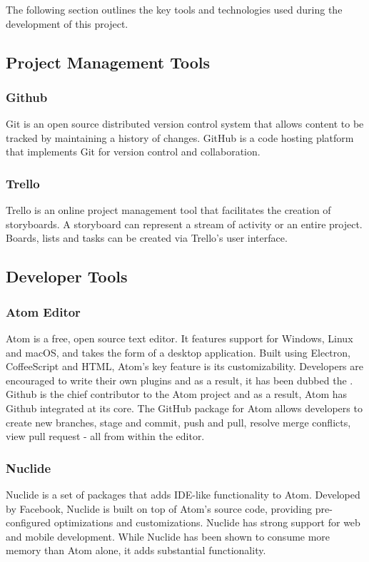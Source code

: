 The following section outlines the key tools and technologies used during the development of this project.


\subsection{Project Management Tools}

\subsubsection{Github}
Git is an open source distributed version control system that allows content to be tracked by maintaining a history of changes. GitHub is a code hosting platform that implements Git for version control and collaboration.
\subsubsection{Trello}
Trello is an online project management tool that facilitates the creation of storyboards. A storyboard can represent a stream of activity or an entire project. Boards, lists and tasks can be created via Trello's user interface. 


\subsection{Developer Tools}

\subsubsection{Atom Editor}
Atom is a free, open source text editor. It features support for Windows, Linux and macOS, and takes the form of a desktop application. Built using Electron, CoffeeScript and HTML, Atom’s key feature is its customizability. Developers are encouraged to write their own plugins and as a result, it has been dubbed the \cite{atom}.
Github is the chief contributor to the Atom project and as a result, Atom has Github integrated at its core. The GitHub package for Atom allows developers to create new branches, stage and commit, push and pull, resolve merge conflicts, view pull request - all from within the editor. 


\subsubsection{Nuclide}
Nuclide is a set of packages that adds IDE-like functionality to Atom. Developed by Facebook, Nuclide is built on top of Atom’s source code, providing pre-configured optimizations and customizations. Nuclide has strong support for web and mobile development. While Nuclide has been shown to consume more memory than Atom alone, it adds substantial functionality.\cite{nuclide} 

